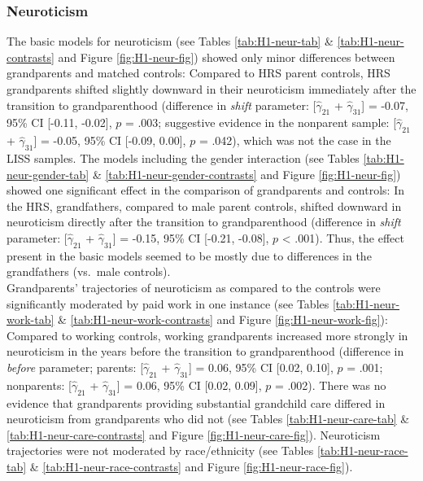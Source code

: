 \documentclass[
  english,
  man,floatsintext]{apa7}
\begin{document}
\hypertarget{neuroticism}{%
\subsubsection{Neuroticism}\label{neuroticism}}

The basic models for neuroticism (see Tables \ref{tab:H1-neur-tab} \& \ref{tab:H1-neur-contrasts} and Figure \ref{fig:H1-neur-fig}) showed only minor differences between grandparents and matched controls: Compared to HRS parent controls, HRS grandparents shifted slightly downward in their neuroticism immediately after the transition to grandparenthood (difference in \emph{shift} parameter: {[}\(\hat{\gamma}_{21}\) + \(\hat{\gamma}_{31}\){]} = -0.07, 95\% CI {[}-0.11, -0.02{]}, \(p\) = .003; suggestive evidence in the nonparent sample: {[}\(\hat{\gamma}_{21}\) + \(\hat{\gamma}_{31}\){]} = -0.05, 95\% CI {[}-0.09, 0.00{]}, \(p\) = .042), which was not the case in the LISS samples. The models including the gender interaction (see Tables \ref{tab:H1-neur-gender-tab} \& \ref{tab:H1-neur-gender-contrasts} and Figure \ref{fig:H1-neur-fig}) showed one significant effect in the comparison of grandparents and controls: In the HRS, grandfathers, compared to male parent controls, shifted downward in neuroticism directly after the transition to grandparenthood (difference in \emph{shift} parameter: {[}\(\hat{\gamma}_{21}\) + \(\hat{\gamma}_{31}\){]} = -0.15, 95\% CI {[}-0.21, -0.08{]}, \(p\) \textless{} .001). Thus, the effect present in the basic models seemed to be mostly due to differences in the grandfathers (vs.~male controls).\\
Grandparents' trajectories of neuroticism as compared to the controls were significantly moderated by paid work in one instance (see Tables \ref{tab:H1-neur-work-tab} \& \ref{tab:H1-neur-work-contrasts} and Figure \ref{fig:H1-neur-work-fig}): Compared to working controls, working grandparents increased more strongly in neuroticism in the years before the transition to grandparenthood (difference in \emph{before} parameter; parents: {[}\(\hat{\gamma}_{21}\) + \(\hat{\gamma}_{31}\){]} = 0.06, 95\% CI {[}0.02, 0.10{]}, \(p\) = .001; nonparents: {[}\(\hat{\gamma}_{21}\) + \(\hat{\gamma}_{31}\){]} = 0.06, 95\% CI {[}0.02, 0.09{]}, \(p\) = .002). There was no evidence that grandparents providing substantial grandchild care differed in neuroticism from grandparents who did not (see Tables \ref{tab:H1-neur-care-tab} \& \ref{tab:H1-neur-care-contrasts} and Figure \ref{fig:H1-neur-care-fig}). Neuroticism trajectories were not moderated by race/ethnicity (see Tables \ref{tab:H1-neur-race-tab} \& \ref{tab:H1-neur-race-contrasts} and Figure \ref{fig:H1-neur-race-fig}).
\end{document}
